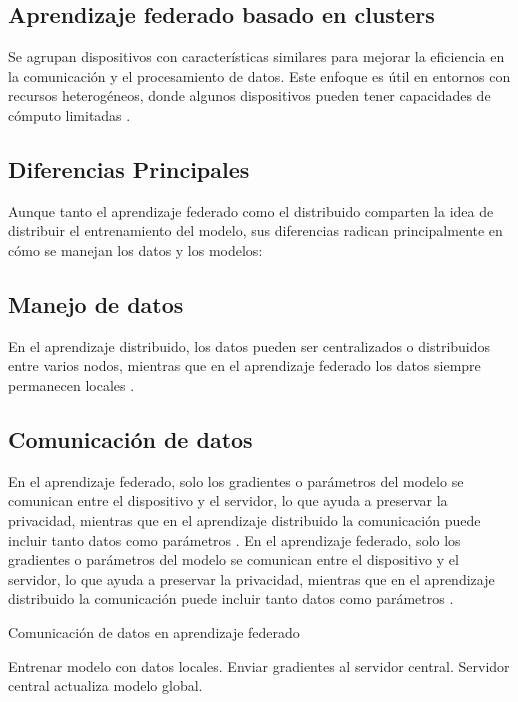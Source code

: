 \subsection{Aprendizaje federado basado en clusters}
Se agrupan dispositivos con características similares para mejorar la eficiencia en la comunicación y el procesamiento de datos. Este enfoque es útil en entornos con recursos heterogéneos, donde algunos dispositivos pueden tener capacidades de cómputo limitadas \cite{kairouz2021advances}.

\subsection{Diferencias Principales}
Aunque tanto el aprendizaje federado como el distribuido comparten la idea de distribuir el entrenamiento del modelo, sus diferencias radican principalmente en cómo se manejan los datos y los modelos:

\subsection{Manejo de datos}
En el aprendizaje distribuido, los datos pueden ser centralizados o distribuidos entre varios nodos, mientras que en el aprendizaje federado los datos siempre permanecen locales \cite{zaeraaprendizaje}.

\subsection{Comunicación de datos}
En el aprendizaje federado, solo los gradientes o parámetros del modelo se comunican entre el dispositivo y el servidor, lo que ayuda a preservar la privacidad, mientras que en el aprendizaje distribuido la comunicación puede incluir tanto datos como parámetros \cite{cardoso2024implementacion}.
En el aprendizaje federado, solo los gradientes o parámetros del modelo se comunican entre el dispositivo y el servidor, lo que ayuda a preservar la privacidad, mientras que en el aprendizaje distribuido la comunicación puede incluir tanto datos como parámetros \cite{cardoso2024implementacion}.

\begin{algorithm}
	\caption{Comunicación de datos en aprendizaje federado}
	\begin{algorithmic}[1]
		\STATE Entrenar modelo con datos locales.
		\STATE Enviar gradientes al servidor central.
		\ENDFOR
		\STATE Servidor central actualiza modelo global.
	\end{algorithmic}
\end{algorithm}
